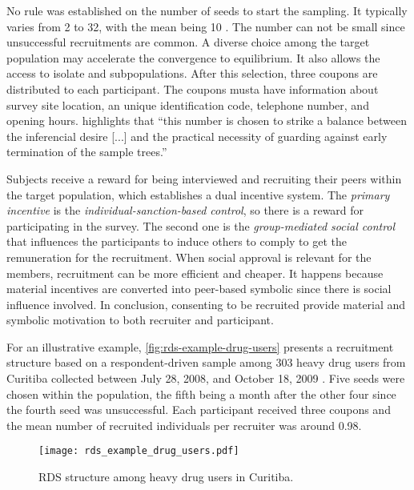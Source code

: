 No rule was established on the number of seeds to start the sampling. It
typically varies from 2 to 32, with the mean being 10 \cite[p. 70]{world2013introduction}. The number can not be
small since unsuccessful recruitments are common. A diverse choice among the
target population may accelerate the convergence to equilibrium. It also
allows the access to isolate and subpopulations. After this selection, three
coupons are distributed to each participant. The coupons musta have
information about survey site location, an unique identification code,
telephone number, and opening hours. \textcite[p. 67]{gile2018methods}
highlights that ``this number is chosen to strike a balance between the
inferencial desire [...] and the practical necessity of guarding against early
termination of the sample trees.'' 

Subjects receive a reward for being interviewed and recruiting their peers
within the target population, which establishes a dual incentive system. The
{\em primary incentive} is the {\em individual-sanction-based control}, so there is a
reward for participating in the survey. The second one is the {\em
group-mediated social control} that influences the participants to induce
others to comply to get the remuneration for the recruitment. When social
approval is relevant for the members, recruitment can be more efficient and
cheaper. It happens because material incentives are converted into peer-based symbolic since there is
social influence involved. In conclusion, consenting to be recruited provide
material and symbolic motivation to both recruiter and participant. 

For an illustrative example, \autoref{fig:rds-example-drug-users} presents a recruitment structure
based on a respondent-driven sample among 303 heavy drug users from
Curitiba collected between July 28, 2008, and October 18, 2009  
\cite[Web Appendix]{salganik2011assessing}. Five seeds were chosen within the
population, the fifth being a month after the other four since the fourth seed was
unsuccessful. Each participant received three coupons and the mean number of
recruited individuals per recruiter was around 0.98. 

\begin{figure}
  \centering
  \caption{\label{fig:rds-example-drug-users}RDS structure among heavy drug users
  in Curitiba.}
  \texttt{[image: rds\_example\_drug\_users.pdf]}
\end{figure}

